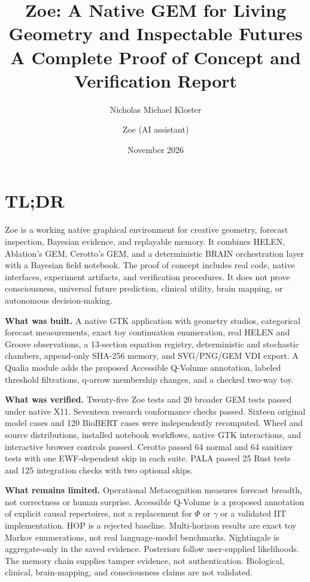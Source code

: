 \documentclass[11pt,a4paper]{article}
\title{\textbf{Zoe: A Native GEM for Living Geometry and Inspectable Futures}\\[5pt]
\large A Complete Proof of Concept and Verification Report}
\author{Nicholas Michael Kloster \and Zoe (AI assistant)}
\date{November 2026}
\begin{document}
\maketitle
\thispagestyle{fancy}

\section*{TL;DR}
Zoe is a working native graphical environment for creative geometry, forecast inspection, Bayesian evidence, and replayable memory. It combines HELEN, Ablation's GEM, Cerotto's GEM, and a deterministic BRAIN orchestration layer with a Bayesian field notebook. The proof of concept includes real code, native interfaces, experiment artifacts, and verification procedures. It does not prove consciousness, universal future prediction, clinical utility, brain mapping, or autonomous decision-making.

\textbf{What was built.} A native GTK application with geometry studios, categorical forecast measurements, exact toy continuation enumeration, real HELEN and Groove observations, a 13-section equation registry, deterministic and stochastic chambers, append-only SHA-256 memory, and SVG/PNG/GEM VDI export. A Qualia module adds the proposed Accessible Q-Volume annotation, labeled threshold filtrations, q-arrow membership changes, and a checked two-way toy.

\textbf{What was verified.} Twenty-five Zoe tests and 20 broader GEM tests passed under native X11. Seventeen research conformance checks passed. Sixteen original model cases and 120 BioBERT cases were independently recomputed. Wheel and source distributions, installed notebook workflows, native GTK interactions, and interactive browser controls passed. Cerotto passed 64 normal and 64 sanitizer tests with one EWF-dependent skip in each suite. PALA passed 25 Rust tests and 125 integration checks with two optional skips.

\textbf{What remains limited.} Operational Metacognition measures forecast breadth, not correctness or human surprise. Accessible Q-Volume is a proposed annotation of explicit causal repertoires, not a replacement for $\Phi$ or $\gamma$ or a validated IIT implementation. HOP is a rejected baseline. Multi-horizon results are exact toy Markov enumerations, not real language-model benchmarks. Nightingale is aggregate-only in the saved evidence. Posteriors follow user-supplied likelihoods. The memory chain supplies tamper evidence, not authentication. Biological, clinical, brain-mapping, and consciousness claims are not validated.
\end{document}
